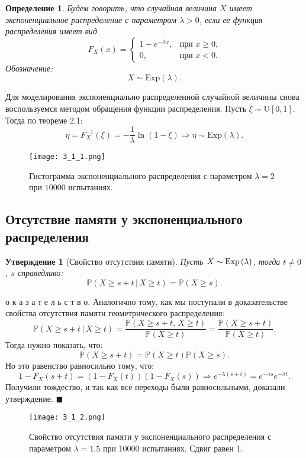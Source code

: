 \documentclass[a4paper, 11pt]{article}
\theoremstyle{def}
\newtheorem{definition}{Определение}[section]
\theoremstyle{th}
\newtheorem{assertion}{Утверждение}[section]
\theoremstyle{rem}
\renewenvironment{proof}{\parД о к а з а т е л ь с т в о.}{\hfill$\blacksquare$}
\newcommand{\p}{\mathbb{P}}
\begin{document}
\begin{definition}
        Будем говорить, что случайная величина $X$ \textit{имеет экспоненциальное распределение с параметром $\lambda > 0$}, если ее функция распределения имеет вид
$$
        F_X(x) = 
        \begin{cases}
                1 - e^{-\lambda x},& \mbox{при $x \geqslant 0$,} \\
                0, & \mbox{при $x < 0$.}
        \end{cases}
$$
        Обозначение:
$$
        X \sim \mbox{Exp}(\lambda).
$$
\end{definition}
Для моделирования экспоненциально распределенной случайной величины снова воспользуемся методом обращения функции распределения. Пусть $\xi \sim \mbox{U}[0, 1]$. Тогда по теореме 2.1:
$$
\eta = F_{X}^{-1}(\xi) = -\frac{1}{\lambda}\ln{(1-\xi)} \Rightarrow \eta \sim \mbox{Exp}(\lambda).
$$
\begin{figure}[H]
    \centering
    \texttt{[image: 3\_1\_1.png]}
    \caption{Гистограмма экспоненциального распределения с параметром $\lambda = 2$ при $10000$ испытаниях.}
\end{figure}
\subsection{Отсутствие памяти у экспоненциального распределения}

\begin{assertion}[Свойство отсутствия памяти]
        Пусть $X\sim\mbox{Exp\,}(\lambda)$, тогда \forall $t \neq 0$, \forall $s$ справедливо:
$$
        \p(X\geqslant s+t\,|\,X\geqslant t) =
        \p(X \geqslant s).
$$
\end{assertion}

\begin{proof}
        Аналогично тому, как мы поступали в доказательстве свойства отсутствия памяти геометрического распределения:
$$
        \p(X \geqslant s + t\,|\,X\geqslant t) =
        \frac{\p(X \geqslant s + t,\,X\geqslant t)}{\p(X\geqslant t)} =
        \frac{\p(X \geqslant s + t)}{\p(X\geqslant t)}.
$$
Тогда нужно показать, что:
$$
        \p(X\geqslant s+t) = 
        \p(X\geqslant t)\p(X\geqslant s).
$$
Но это равенство равносильно тому, что:
$$
1-F_X(s+t) = (1-F_X(t))(1-F_X(s)) \Rightarrow e^{-\lambda(s+t)} = e^{-\lambda s}e^{-\lambda t}.
$$
Получили тождество, и так как все переходы были равносильными, доказали утверждение.
\end{proof}
\begin{figure}[h]
        \centering
        \texttt{[image: 3\_1\_2.png]}
        \caption{Свойство отсутствия памяти у экспоненциального распределения с параметром $\lambda = 1.5$ при $10000$ испытаниях. Сдвиг равен 1.}
\end{figure}
\end{document}
